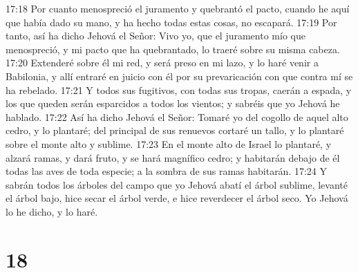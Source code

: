 17:18 Por cuanto menospreció el juramento y quebrantó el pacto, cuando he aquí que había dado su mano, y ha hecho todas estas cosas, no escapará.  
17:19 Por tanto, así ha dicho Jehová el Señor: Vivo yo, que el juramento mío que menospreció, y mi pacto que ha quebrantado, lo traeré sobre su misma cabeza.  
17:20 Extenderé sobre él mi red, y será preso en mi lazo, y lo haré venir a Babilonia, y allí entraré en juicio con él por su prevaricación con que contra mí se ha rebelado.  
17:21 Y todos sus fugitivos, con todas sus tropas, caerán a espada, y los que queden serán esparcidos a todos los vientos; y sabréis que yo Jehová he hablado.  
17:22 Así ha dicho Jehová el Señor: Tomaré yo del cogollo de aquel alto cedro, y lo plantaré; del principal de sus renuevos cortaré un tallo, y lo plantaré sobre el monte alto y sublime.  
17:23 En el monte alto de Israel lo plantaré, y alzará ramas, y dará fruto, y se hará magnífico cedro; y habitarán debajo de él todas las aves de toda especie; a la sombra de sus ramas habitarán.  
17:24 Y sabrán todos los árboles del campo que yo Jehová abatí el árbol sublime, levanté el árbol bajo, hice secar el árbol verde, e hice reverdecer el árbol seco. Yo Jehová lo he dicho, y lo haré.  

\chapter{18}

